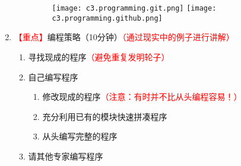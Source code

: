 \documentclass{TIJMUjiaoanLL}
\begin{document}
\begin{enumerate}
\begin{enumerate}
\vspace*{-1em}
\begin{figure}[h]
  \texttt{[image: c3.programming.git.png]}
  \texttt{[image: c3.programming.github.png]}
\end{figure}
    \end{enumerate}
  \item \textcolor{red}{【重点】}编程策略（10分钟）\textcolor{red}{（通过现实中的例子进行讲解）}
    \begin{enumerate}
      \item 寻找现成的程序\textcolor{red}{（避免重复发明轮子）}
      \item 自己编写程序
	\begin{enumerate}
	  \item 修改现成的程序\textcolor{red}{（注意：有时并不比从头编程容易！）}
	  \item 充分利用已有的模块快速拼凑程序
	  \item 从头编写完整的程序
	\end{enumerate}
      \item 请其他专家编写程序
    \end{enumerate}

\otherTail
\newpage
\otherHeader


\end{enumerate}
\end{document}
